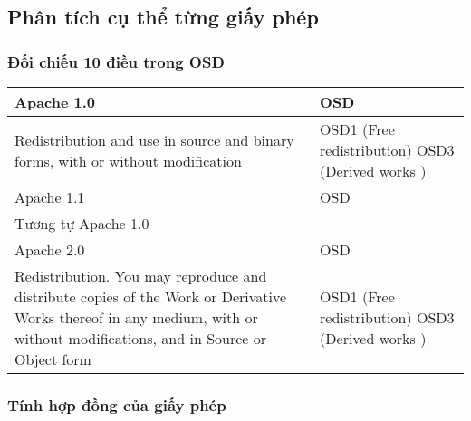 \documentclass[12pt]{article}
\begin{document}
\subsection{Phân tích cụ thể từng giấy phép}
\subsubsection{Đối chiếu 10 điều trong OSD}

\begin{tabularx}{\textwidth}{|X|X|}
\hline
Apache 1.0 & OSD \\ 
\hline 
Redistribution and use in source and binary forms, with or without modification \newline
& 
OSD1 (Free redistribution) \newline
OSD3 (Derived works ) \\
\hline


Apache 1.1 & OSD \\ 
\hline 
Tương tự Apache 1.0 \newline
& 
\\
\hline

Apache 2.0 & OSD \\ 
\hline 
Redistribution. You may reproduce and distribute copies of the Work or Derivative Works thereof in any medium, with or without modifications, and in Source or Object form
&
OSD1 (Free redistribution) \newline
OSD3 (Derived works )
\\
\hline
\end{tabularx}


\subsubsection{Tính hợp đồng của giấy phép}
\end{document}
